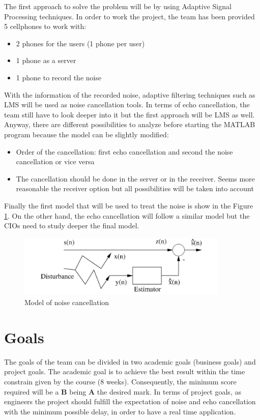 \documentclass[11pt]{article}
\begin{document}
The first approach to solve the problem will be by using Adaptive Signal Processing techniques. In order to work the project, the team has been provided 5 cellphones to work with:

\begin{itemize}
\item 2 phones for the users (1 phone per user)
\item 1 phone as a server
\item 1 phone to record the noise
\end{itemize}

With the information of the recorded noise, adaptive filtering techniques such as LMS will be used as noise cancellation tools. In terms of echo cancellation, the team still have to look deeper into it but the first approach will be LMS as well. Anyway, there are different possibilities to analyze before starting the MATLAB program because the model can be slightly modified:

\begin{itemize}
\item Order of the cancellation: first echo cancellation and second the noise cancellation or vice versa
\item The cancellation should be done in the server or in the receiver. Seems more reasonable the receiver option but all possibilities will be taken into account
\end{itemize}


Finally the first model that will be used to treat the noise is show in the Figure \ref{model}. On the other hand, the echo cancellation will follow a similar model but the CIOs need to study deeper the final model.

		\begin{figure}[h]
		\centering
		\includegraphics[width=10cm]{model}
		\caption{Model of noise cancellation}
		\label{model}
		\end{figure}

\section{Goals}

The goals of the team can be divided in two academic goals (business goals) and project goals. The academic goal is to achieve the best result within the time constrain given by the course (8 weeks). Consequently, the minimum score required will be a \textbf{B} being \textbf{A} the desired mark. In terms of project goals, as engineers the project should fulfill the expectation of noise and echo cancellation with the minimum possible delay, in order to have a real time application.
\end{document}
